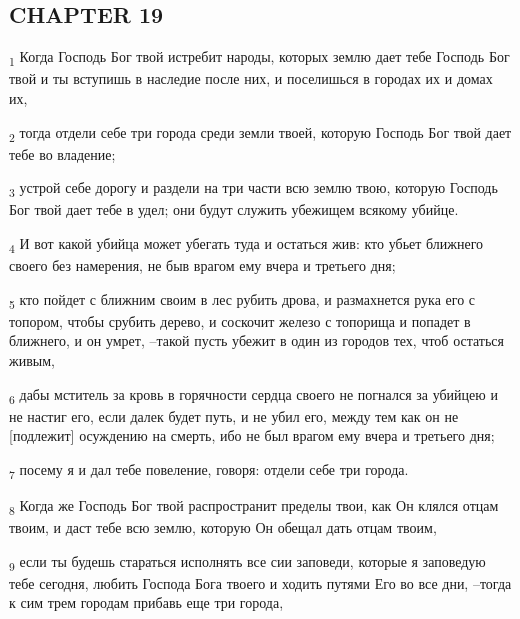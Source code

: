 \subsection{CHAPTER 19}
\begin{tcolorbox}
\textsubscript{1} Когда Господь Бог твой истребит народы, которых землю дает тебе Господь Бог твой и ты вступишь в наследие после них, и поселишься в городах их и домах их,
\end{tcolorbox}
\begin{tcolorbox}
\textsubscript{2} тогда отдели себе три города среди земли твоей, которую Господь Бог твой дает тебе во владение;
\end{tcolorbox}
\begin{tcolorbox}
\textsubscript{3} устрой себе дорогу и раздели на три части всю землю твою, которую Господь Бог твой дает тебе в удел; они будут служить убежищем всякому убийце.
\end{tcolorbox}
\begin{tcolorbox}
\textsubscript{4} И вот какой убийца может убегать туда и остаться жив: кто убьет ближнего своего без намерения, не быв врагом ему вчера и третьего дня;
\end{tcolorbox}
\begin{tcolorbox}
\textsubscript{5} кто пойдет с ближним своим в лес рубить дрова, и размахнется рука его с топором, чтобы срубить дерево, и соскочит железо с топорища и попадет в ближнего, и он умрет, --такой пусть убежит в один из городов тех, чтоб остаться живым,
\end{tcolorbox}
\begin{tcolorbox}
\textsubscript{6} дабы мститель за кровь в горячности сердца своего не погнался за убийцею и не настиг его, если далек будет путь, и не убил его, между тем как он не [подлежит] осуждению на смерть, ибо не был врагом ему вчера и третьего дня;
\end{tcolorbox}
\begin{tcolorbox}
\textsubscript{7} посему я и дал тебе повеление, говоря: отдели себе три города.
\end{tcolorbox}
\begin{tcolorbox}
\textsubscript{8} Когда же Господь Бог твой распространит пределы твои, как Он клялся отцам твоим, и даст тебе всю землю, которую Он обещал дать отцам твоим,
\end{tcolorbox}
\begin{tcolorbox}
\textsubscript{9} если ты будешь стараться исполнять все сии заповеди, которые я заповедую тебе сегодня, любить Господа Бога твоего и ходить путями Его во все дни, --тогда к сим трем городам прибавь еще три города,
\end{tcolorbox}
